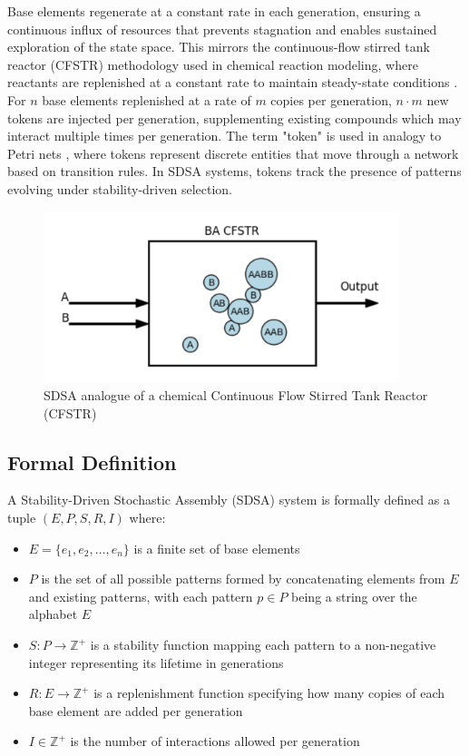 \documentclass[preprint,12pt]{elsarticle}
\begin{document}
Base elements regenerate at a constant rate in each generation, ensuring a continuous influx of resources that prevents stagnation and enables sustained exploration of the state space. This mirrors the continuous-flow stirred tank reactor (CFSTR) methodology used in chemical reaction modeling, where reactants are replenished at a constant rate to maintain steady-state conditions \cite{fogler1999chemical}. For \( n \) base elements replenished at a rate of \( m \) copies per generation, \( n \cdot m \) new tokens are injected per generation, supplementing existing compounds which may interact multiple times per generation. The term "token" is used in analogy to Petri nets \cite{petri1962communication}, where tokens represent discrete entities that move through a network based on transition rules. In SDSA systems, tokens track the presence of patterns evolving under stability-driven selection.

\begin{figure}[htp]
    \centering
    \includegraphics[height=5cm]{figure_1}
    \caption{SDSA analogue of a chemical Continuous Flow Stirred Tank Reactor (CFSTR)}
    \label{fig:figure_1}
\end{figure}

\subsection{Formal Definition}

A Stability-Driven Stochastic Assembly (SDSA) system is formally defined as a tuple $(E, P, S, R, I)$ where:
\begin{itemize}
   \item $E = \{e_1, e_2, \ldots, e_n\}$ is a finite set of base elements
   \item $P$ is the set of all possible patterns formed by concatenating elements from $E$ and existing patterns, with each pattern $p \in P$ being a string over the alphabet $E$
   \item $S: P \rightarrow \mathbb{Z}^{+}$ is a stability function mapping each pattern to a non-negative integer representing its lifetime in generations
   \item $R: E \rightarrow \mathbb{Z}^{+}$ is a replenishment function specifying how many copies of each base element are added per generation
   \item $I \in \mathbb{Z}^{+}$ is the number of interactions allowed per generation
\end{itemize}
\end{document}
